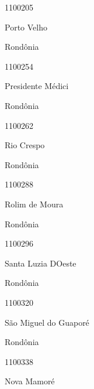 \documentclass[
  letterpaper,
]{report}
\begin{document}
1100205

\n      

Porto Velho

\n    

\n    

\n      

Rondônia

\n      

1100254

\n      

Presidente Médici

\n    

\n    

\n      

Rondônia

\n      

1100262

\n      

Rio Crespo

\n    

\n    

\n      

Rondônia

\n      

1100288

\n      

Rolim de Moura

\n    

\n    

\n      

Rondônia

\n      

1100296

\n      

Santa Luzia D\textquotesingle Oeste

\n    

\n    

\n      

Rondônia

\n      

1100320

\n      

São Miguel do Guaporé

\n    

\n    

\n      

Rondônia

\n      

1100338

\n      

Nova Mamoré

\n    
\end{document}

